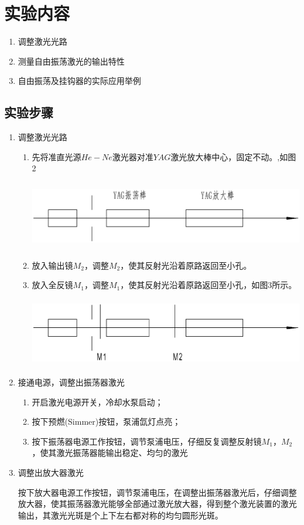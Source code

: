 \documentclass[UTF8]{ctexart}
\makeatletter
\newcommand{\figcaption}{\def\@captype{figure}\caption}
\makeatother
\begin{document}
\section{实验内容}
\begin{enumerate}
	\item 调整激光光路
	\item 测量自由振荡激光的输出特性
	\item 自由振荡及挂钩器的实际应用举例
\end{enumerate}
\subsection{实验步骤}
\begin{enumerate}
	\item 调整激光光路
	\begin{enumerate}
\item 先将准直光源$He-Ne$激光器对准$YAG$激光放大棒中心，固定不动。,如图2
		\begin{center}
			\includegraphics[width=13cm,height=3cm]{1.eps}
			\figcaption{第一次调整激光光路}\label{1.eps}
		\end{center}
		\item 放入输出镜$M_{2}$，调整$M_{2}$，使其反射光沿着原路返回至小孔。
		\item 放入全反镜$M_{1}$，调整$M_{1}$，使其反射光沿着原路返回至小孔，如图3所示。
		\begin{center}
				\includegraphics[width=13cm,height=3cm]{2.eps}
				\figcaption{第二次调整光路}\label{2.eps}
		\end{center}
	\end{enumerate}
\item 接通电源，调整出振荡器激光
	\begin{enumerate}
		\item 开启激光电源开关，冷却水泵启动；
		\item 按下预燃(Simmer)按钮，泵浦氙灯点亮；
		\item 按下振荡器电源工作按钮，调节泵浦电压，仔细反复调整反射镜$M_{1}$，$M_{2}$，使其激光振荡器能输出稳定、均匀的激光
	\end{enumerate}
\item 调整出放大器激光
	
	按下放大器电源工作按钮，调节泵浦电压，在调整出振荡器激光后，仔细调整放大器，使其振荡器激光能够全部通过激光放大器，得到整个激光装置的激光输出，其激光光斑是个上下左右都对称的均匀圆形光斑。
\end{enumerate}
\end{document}
